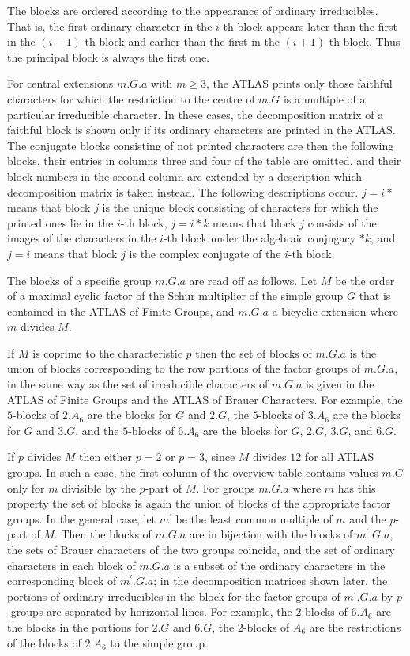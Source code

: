 \documentclass[a4paper]{article}
\def\ATLAS{{\sf ATLAS}}
\begin{document}
The blocks are ordered according to the appearance of ordinary
irreducibles.
That is, the first ordinary character in the $i$-th block appears later
than the first in the $(i-1)$-th block and earlier than the first in the
$(i+1)$-th block.
Thus the principal block is always the first one.

For central extensions $m.G.a$ with $m \geq 3$,
the {\ATLAS} prints only those faithful characters for which
the restriction to the centre of $m.G$ is a multiple of a particular
irreducible character.
In these cases, the decomposition matrix of a faithful block is shown
only if its ordinary characters are printed in the {\ATLAS}.
The conjugate blocks consisting of not printed characters are then the
following blocks, their entries in columns three and four of the table
are omitted, and their block numbers in the second column are extended
by a description which decomposition matrix is taken instead.
The following descriptions occur.
$j = i\ast$ means that block $j$ is the unique block consisting of
characters for which the printed ones lie in the $i$-th block,
$j = i\ast k$ means that block $j$ consists of the images of the
characters in the $i$-th block under the algebraic conjugacy $\ast k$,
and $j = \overline{i}$ means that block $j$ is the complex conjugate of
the $i$-th block.

The blocks of a specific group $m.G.a$ are read off as follows.
Let $M$ be the order of a maximal cyclic factor of the Schur multiplier
of the simple group $G$ that is contained in the {\ATLAS} of Finite
Groups,
and $m.G.a$ a bicyclic extension where $m$ divides $M$.

If $M$ is coprime to the characteristic $p$ then the set of blocks of
$m.G.a$ is the union of blocks corresponding to the row portions
of the factor groups of $m.G.a$,
in the same way as the set of irreducible characters of $m.G.a$ is given
in the {\ATLAS} of Finite Groups and the {\ATLAS} of Brauer Characters.
For example, the $5$-blocks of $2.A_6$ are the blocks for $G$ and $2.G$,
the $5$-blocks of $3.A_6$ are the blocks for $G$ and $3.G$,
and the $5$-blocks of $6.A_6$ are the blocks for $G$, $2.G$, $3.G$, and
$6.G$.

If $p$ divides $M$ then either $p = 2$ or $p = 3$,
since $M$ divides $12$ for all {\ATLAS} groups.
In such a case, the first column of the overview table contains values
$m.G$ only for $m$ divisible by the $p$-part of $M$.
For groups $m.G.a$ where $m$ has this property the set of blocks is again
the union of blocks of the appropriate factor groups.
In the general case, let $m^{\prime}$ be the least common multiple of $m$
and the $p$-part of $M$.
Then the blocks of $m.G.a$ are in bijection with the blocks of
$m^{\prime}.G.a$, the sets of Brauer characters of the two groups
coincide,
and the set of ordinary characters in each block of $m.G.a$ is a subset
of the ordinary characters in the corresponding block of
$m^{\prime}.G.a$;
in the decomposition matrices shown later, the portions of ordinary
irreducibles in the block for the factor groups of $m^{\prime}.G.a$ by
$p$-groups are separated by horizontal lines.
For example, the $2$-blocks of $6.A_6$ are the blocks in the portions
for $2.G$ and $6.G$, the $2$-blocks of $A_6$ are the restrictions of the
blocks of $2.A_6$ to the simple group.
\end{document}
